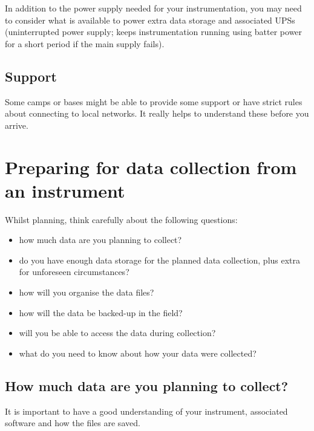 \documentclass[12pt,a4paper,oneside]{report}
\providecommand{\tightlist}{%
  \setlength{\itemsep}{0pt}\setlength{\parskip}{0pt}}
\begin{document}
In addition to the power supply needed for your instrumentation, you may
need to consider what is available to power extra data storage and
associated UPSs (uninterrupted power supply; keeps instrumentation
running using batter power for a short period if the main supply fails).

\hypertarget{support}{%
\subsection{Support}\label{support}}

Some camps or bases might be able to provide some support or have strict
rules about connecting to local networks. It really helps to understand
these before you arrive.

\hypertarget{preparing-for-data-collection-from-an-instrument}{%
\section{Preparing for data collection from an
instrument}\label{preparing-for-data-collection-from-an-instrument}}

Whilst planning, think carefully about the following questions:

\begin{itemize}
\tightlist
\item
  how much data are you planning to collect?
\item
  do you have enough data storage for the planned data collection, plus
  extra for unforeseen circumstances?
\item
  how will you organise the data files?
\item
  how will the data be backed-up in the field?
\item
  will you be able to access the data during collection?
\item
  what do you need to know about how your data were collected?
\end{itemize}

\hypertarget{how-much-data-are-you-planning-to-collect}{%
\subsection{How much data are you planning to
collect?}\label{how-much-data-are-you-planning-to-collect}}

It is important to have a good understanding of your instrument,
associated software and how the files are saved.
\end{document}
